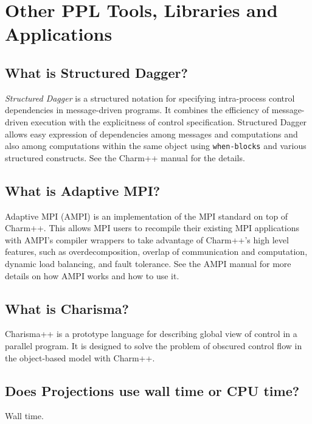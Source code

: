 \section{Other PPL Tools, Libraries and Applications}

\subsection{What is Structured Dagger?}

{\em Structured Dagger} is a structured notation for specifying intra-process
control dependencies in message-driven programs. It combines the efficiency
of message-driven execution with the explicitness of control specification.
Structured Dagger allows easy expression of dependencies among messages
and computations and also among computations within the same object using
{\tt when-blocks}
and various structured constructs. See the Charm++ manual for the details.

\subsection{What is Adaptive MPI?}

Adaptive MPI (AMPI) is an implementation of the MPI standard on top of Charm++.
This allows MPI users to recompile their existing MPI applications
with AMPI's compiler wrappers to take advantage of Charm++'s high
level features, such as overdecomposition, overlap of communication
and computation, dynamic load balancing, and fault tolerance.
See the AMPI manual for more details on how AMPI works and how to use it.

\subsection{What is Charisma?}

Charisma++ is a prototype language for describing global view of control in a parallel program. It is designed to solve the problem of obscured control flow in the object-based model with Charm++.

\subsection{Does Projections use wall time or CPU time?}

Wall time.
